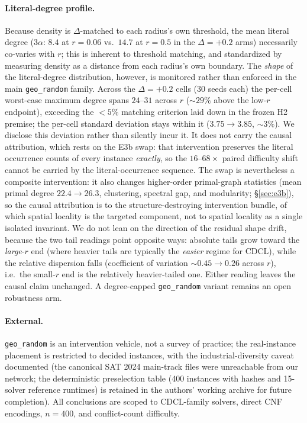 \documentclass[pdflatex,sn-basic,Numbered]{sn-jnl}
\begin{document}
\paragraph{Literal-degree profile.}
Because density is $\Delta$-matched to each radius's own threshold, the mean
literal degree ($3\alpha$: $8.4$ at $r=0.06$ vs.\ $14.7$ at $r=0.5$ in the
$\Delta{=}{+}0.2$ arms) necessarily co-varies with $r$; this is inherent to
threshold matching, and standardized by measuring density as a distance from
each radius's own boundary. The \emph{shape} of the literal-degree
distribution, however, is monitored rather than enforced in the main
\texttt{geo\_random} family. Across the $\Delta{=}{+}0.2$ cells (30 seeds
each) the per-cell worst-case maximum degree spans $24$--$31$ across $r$
(${\sim}29\%$ above the low-$r$ endpoint), exceeding the ${<}5\%$ matching
criterion laid down in the frozen H2 premise; the per-cell standard
deviation stays within it ($3.75 \to 3.85$, ${\sim}3\%$). We disclose this
deviation rather than silently incur it. It does not carry the causal
attribution, which rests on the E3b swap: that intervention preserves
the literal occurrence counts of every instance \emph{exactly}, so the
$16$--$68\times$ paired difficulty shift cannot be carried by the
literal-occurrence sequence. The swap is nevertheless a composite
intervention: it also changes higher-order primal-graph statistics (mean
primal degree $22.4\to26.3$, clustering, spectral gap, and modularity;
\S\ref{sec:e3b}), so the causal attribution is to the structure-destroying
intervention bundle, of which spatial locality is the targeted component,
not to spatial locality as a single isolated invariant. We do
not lean on the direction of the residual shape drift, because the two tail
readings point opposite ways: absolute tails grow toward the \emph{large}-$r$
end (where heavier tails are typically the \emph{easier} regime for CDCL),
while the relative dispersion falls (coefficient of variation ${\sim}0.45 \to
0.26$ across $r$), i.e.\ the small-$r$ end is the relatively heavier-tailed
one. Either reading leaves the causal claim unchanged. A degree-capped
\texttt{geo\_random} variant remains an open robustness arm.

\paragraph{External.}
\texttt{geo\_random} is an intervention vehicle, not a survey of practice;
the real-instance placement is restricted to decided instances, with the
industrial-diversity caveat documented (the canonical SAT 2024 main-track
files were unreachable from our network; the deterministic preselection table
(400 instances with hashes and 15-solver reference runtimes) is retained
in the authors' working archive for future completion). All conclusions are scoped to CDCL-family solvers, direct CNF
encodings, $n=400$, and conflict-count difficulty.
\end{document}
